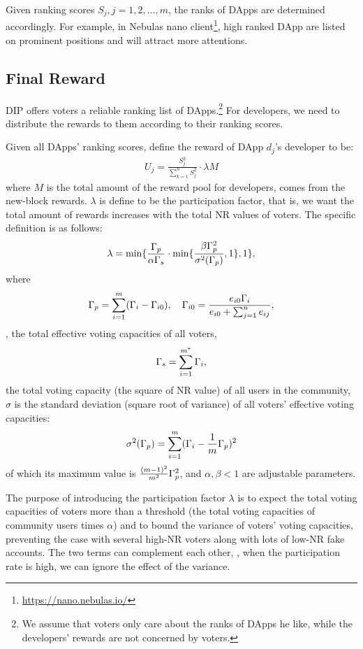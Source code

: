 Given ranking scores $S_j,j=1,2,\ldots,m$, the ranks of DApps are determined accordingly. For example, in Nebulas nano client\footnote{\url{https://nano.nebulas.io/}}, high ranked DApp are listed on prominent positions and will attract more attentions.

\subsection{Final Reward}
\noindent DIP offers voters a reliable ranking list of DApps.\footnote{We assume that voters only care about the ranks of DApps he like, while the developers' rewards are not concerned by voters.} For developers, we need to distribute the rewards to them according to their ranking scores.

Given all DApps' ranking scores, define the reward of DApp $d_j$'s developer to be:
\begin{align}
	\label{eq:distribution}
	U_j = \frac{S_j^2}{\sum_{k=1}^n S_j^2}\cdot \lambda M
\end{align}
where $M$ is  the total amount of the reward pool for developers, comes from
the new-block rewards. $\lambda $ is define to be the participation factor, that is, we want the total amount of rewards increases with the total NR values of voters. The specific definition is as follows:
\begin{align}
	\lambda=\min\{\frac{\Gamma_p}{\alpha \Gamma_s }\cdot \min\{\frac{\beta\Gamma_p^2 }{\sigma^2(\Gamma_p)},1\},1\},
\end{align}
\noindent where $$\Gamma_p = \sum_{i=1}^m (\Gamma_i-\Gamma_{i0}),\quad \Gamma_{i0} = \frac{e_{i0}\Gamma_i}{e_{i0}+\sum_{j=1}^n {e_{ij}}},$$ \ie, the total effective voting capacities of all voters,
$$\Gamma_s = \sum_{i=1}^{m^*} \Gamma_i,$$
\noindent the total voting capacity (the square of NR value) of all users in the community, $\sigma$ is the standard deviation (square root of variance) of all voters' effective voting capacities:
$$ \sigma^2(\Gamma_p) = \sum_{i=1}^m (\Gamma_i-\frac{1}{m}\Gamma_p)^2 $$
of which its maximum value is $\frac{(m-1)^2}{m^2}\Gamma_p^2$, and $\alpha,\beta < 1$ are adjustable parameters.

The purpose of introducing the participation factor $\lambda$ is to expect the total voting capacities of voters more than a threshold (the total voting capacities of  community users times $\alpha$)  and to bound the variance of voters’ voting capacities, preventing the case with several high-NR voters along with lots of low-NR fake accounts. The two terms can complement each other, \ie, when the participation rate is high, we can ignore the effect of the variance.
